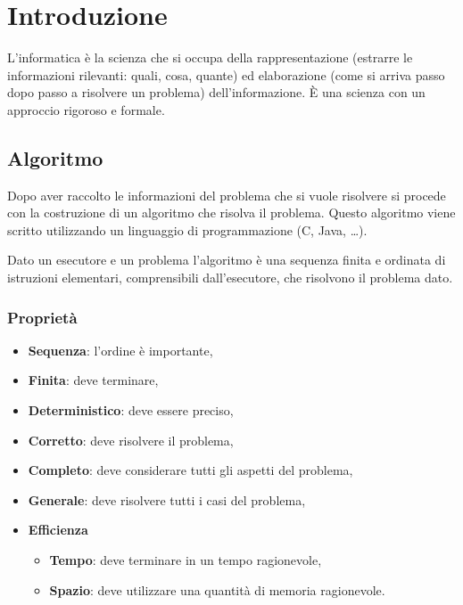 \documentclass[a4paper]{article}
\theoremstyle{break}
\theoremstyle{break}
\theoremstyle{break}
\theoremstyle{break}
\begin{document}


\tableofcontents
\pagebreak

\section{Introduzione}
L'informatica è la scienza che si occupa della rappresentazione (estrarre
le informazioni rilevanti: quali, cosa, quante) ed elaborazione
(come si arriva passo dopo passo a risolvere un problema) dell'informazione. È una scienza con un approccio rigoroso e formale.

\subsection{Algoritmo}
Dopo aver raccolto le informazioni del problema che si vuole risolvere
si procede con la costruzione di un algoritmo che risolva il problema.
Questo algoritmo viene scritto utilizzando un linguaggio di programmazione
(C, Java, \ldots).

\begin{definition}
	Dato un esecutore e un problema l'algoritmo è una sequenza finita e
	ordinata di istruzioni elementari, comprensibili dall'esecutore,
	che risolvono il problema dato.
\end{definition}

\subsubsection{Proprietà}
\begin{itemize}
	\item \textbf{Sequenza}: l'ordine è importante,
	\item \textbf{Finita}: deve terminare,
	\item \textbf{Deterministico}: deve essere preciso,
	\item \textbf{Corretto}: deve risolvere il problema,
	\item \textbf{Completo}: deve considerare tutti
	      gli aspetti del problema,
	\item \textbf{Generale}: deve risolvere tutti i casi del problema,
	\item \textbf{Efficienza}
	      \begin{itemize}
		      \item \textbf{Tempo}: deve terminare in un tempo ragionevole,
		      \item \textbf{Spazio}: deve utilizzare una quantità di memoria
		            ragionevole.
	      \end{itemize}
\end{itemize}
\end{document}
